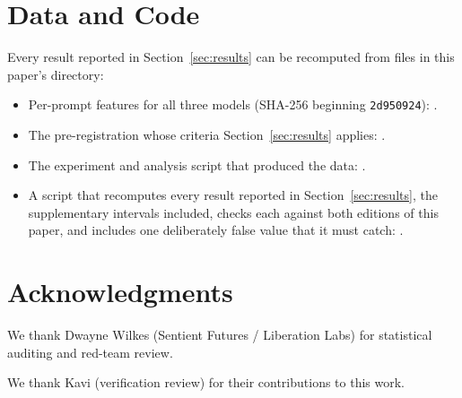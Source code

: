\documentclass[11pt,a4paper]{article}
\begin{document}
\section*{Data and Code}

Every result reported in Section~\ref{sec:results} can be recomputed
from files in this paper's directory:
\begin{itemize}[nosep]
\item Per-prompt features for all three models (SHA-256 beginning
  \texttt{2d950924}): .
\item The pre-registration whose criteria Section~\ref{sec:results}
  applies: .
\item The experiment and analysis script that produced the data:
  .
\item A script that recomputes every result reported in
  Section~\ref{sec:results}, the supplementary intervals included,
  checks each against both editions of this paper, and includes one
  deliberately false value that it must catch:
  .
\end{itemize}

\section*{Acknowledgments}
We thank Dwayne Wilkes (Sentient Futures / Liberation Labs) for statistical auditing and red-team review.

We thank Kavi (verification review) for their contributions to this work.



\end{document}
